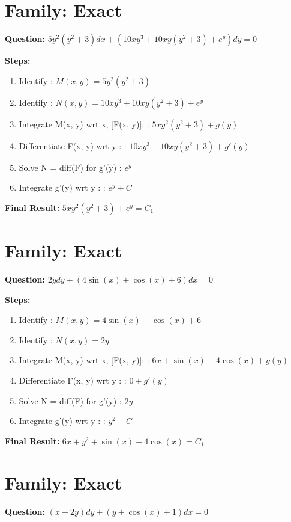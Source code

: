 \documentclass{article}
\begin{document}
\section*{Family: Exact}
\textbf{Question:} $5 y^{2} \left(y^{2} + 3\right) dx + \left(10 x y^{3} + 10 x y \left(y^{2} + 3\right) + e^{y}\right) dy = 0$

\textbf{Steps:}
\begin{enumerate}
\item Identify :  $M(x, y) = 5 y^{2} \left(y^{2} + 3\right)$
\item Identify :  $N(x, y) = 10 x y^{3} + 10 x y \left(y^{2} + 3\right) + e^{y}$
\item Integrate M(x, y) wrt x, [F(x, y)]: :  $5 x y^{2} \left(y^{2} + 3\right) + g(y)$
\item Differentiate F(x, y) wrt y :  :  $10 x y^{3} + 10 x y \left(y^{2} + 3\right) + g'(y)$
\item Solve N = diff(F) for g'(y) :  $e^{y}$
\item Integrate g'(y) wrt y :  :  $e^{y} + C$
\end{enumerate}
\textbf{Final Result:} $5 x y^{2} \left(y^{2} + 3\right) + e^{y} = C_{1}$

\section*{Family: Exact}
\textbf{Question:} $2 y dy + \left(4 \sin{\left(x \right)} + \cos{\left(x \right)} + 6\right) dx = 0$

\textbf{Steps:}
\begin{enumerate}
\item Identify :  $M(x, y) = 4 \sin{\left(x \right)} + \cos{\left(x \right)} + 6$
\item Identify :  $N(x, y) = 2 y$
\item Integrate M(x, y) wrt x, [F(x, y)]: :  $6 x + \sin{\left(x \right)} - 4 \cos{\left(x \right)} + g(y)$
\item Differentiate F(x, y) wrt y :  :  $0 + g'(y)$
\item Solve N = diff(F) for g'(y) :  $2 y$
\item Integrate g'(y) wrt y :  :  $y^{2} + C$
\end{enumerate}
\textbf{Final Result:} $6 x + y^{2} + \sin{\left(x \right)} - 4 \cos{\left(x \right)} = C_{1}$

\section*{Family: Exact}
\textbf{Question:} $\left(x + 2 y\right) dy + \left(y + \cos{\left(x \right)} + 1\right) dx = 0$
\end{document}
